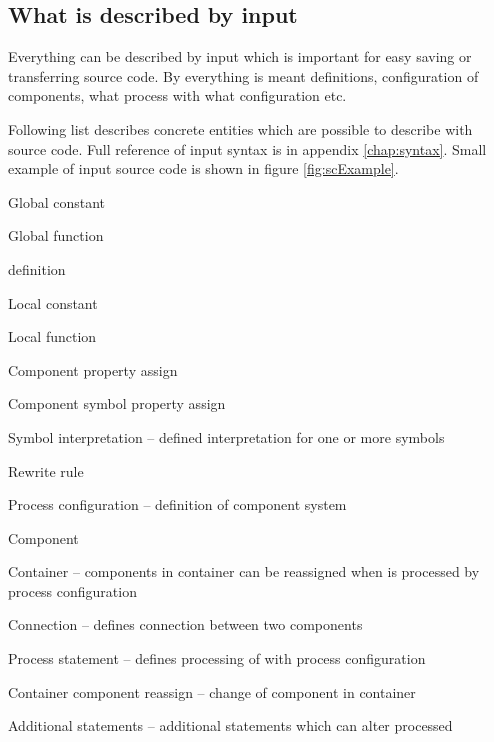 \subsection{What is described by input}

Everything can be described by input which is important for easy saving or transferring source code.
By everything is meant \lsystem definitions, configuration of components, what \lsystem process with what configuration etc.

Following list describes concrete entities which are possible to describe with source code.
Full reference of input syntax is in appendix \ref{chap:syntax}.
Small example of input source code is shown in figure \ref{fig:scExample}.

\begin{itemize*}
	\item Global constant
	\item Global function
	\item \lsystem definition
		\begin{itemize*}
			\item Local constant
			\item Local function
			\item Component property assign
			\item Component symbol property assign
			\item Symbol interpretation -- defined interpretation for one or more \lsystem symbols
			\item Rewrite rule
		\end{itemize*}
	\item Process configuration -- definition of component system
		\begin{itemize*}
			\item Component
			\item Container -- components in container can be reassigned when \lsystem is processed by process configuration
			\item Connection -- defines connection between two components
		\end{itemize*}
	\item Process statement -- defines processing of \lsystem with process configuration
		\begin{itemize*}
			\item Container component reassign -- change of component in container
			\item Additional \lsystem statements -- additional \lsystem statements which can alter processed \lsystem
		\end{itemize*}
\end{itemize*}

